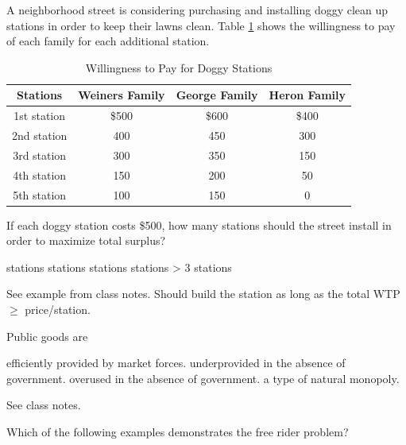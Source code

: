 \documentclass[addpoints,11pt]{exam}
\theoremstyle{definition}
\begin{document}
\begin{questions}
	
	\question A neighborhood street is considering purchasing and installing doggy clean up stations in order to keep their lawns clean. Table \ref{MC15} shows the willingness to pay of each family for each additional station.
	
	\begin{table}[H]
		\caption{Willingness to Pay for Doggy Stations}
		\label{MC15}
		\centering
		\begin{tabular}{ c|c|c|c} 
			
			Stations & Weiners Family & George Family & Heron Family\\
			\hline
			1st station & \$500 & \$600 & \$400\\
			2nd station & 400 & 450 & 300\\
			3rd station & 300 & 350 & 150\\
			4th station & 150 & 200 & 50\\
			5th station & 100 & 150 & 0\\
		\end{tabular}
	\end{table}
	
	If each doggy station costs \$500, how many stations should the street install in order to maximize total surplus?
	
	\begin{choices}
		 stations
		 stations
		 stations
		 stations
		\choice > 3 stations
	\end{choices}

	\begin{solution}
		See example from class notes. Should build the station as long as the total WTP $\ge$ price/station.
	\end{solution}

		\question Public goods are 
		
		\begin{choices}
			\choice efficiently provided by market forces.
			\CorrectChoice underprovided in the absence of government.
			\choice overused in the absence of government.
			\choice a type of natural monopoly.
		\end{choices}
		
		\begin{solution}
			See class notes.
		\end{solution}
		
\newpage
		
	\question Which of the following examples demonstrates the free rider problem?
	\begin{choices}
		

\end{choices}
\end{questions}
\end{document}
